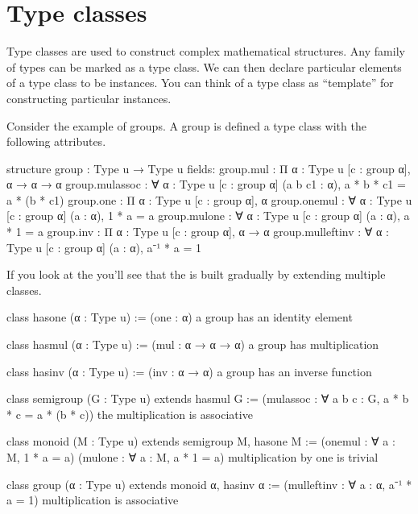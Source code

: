 \documentclass[letterpaper,10pt,english]{sphinxmanual}
\begin{document}
\section{Type classes}
\label{\detokenize{day5:type-classes}}
\sphinxAtStartPar
Type classes are used to construct complex mathematical structures.
Any family of types can be marked as a type class.
We can then declare particular elements of a type class to be instances.
You can think of a type class as “template” for constructing particular instances.

\sphinxAtStartPar
Consider the example of groups.
A group is defined a type class with the following attributes.

\begin{sphinxVerbatim}[commandchars=\\\{\}]
structure group : Type u → Type u
fields:
group.mul : Π \PYGZob{}α : Type u\PYGZcb{} [c : group α], α → α → α
group.mul\PYGZus{}assoc : ∀ \PYGZob{}α : Type u\PYGZcb{} [c : group α] (a b c\PYGZus{}1 : α), a * b * c\PYGZus{}1 = a * (b * c\PYGZus{}1)
group.one : Π \PYGZob{}α : Type u\PYGZcb{} [c : group α], α
group.one\PYGZus{}mul : ∀ \PYGZob{}α : Type u\PYGZcb{} [c : group α] (a : α), 1 * a = a
group.mul\PYGZus{}one : ∀ \PYGZob{}α : Type u\PYGZcb{} [c : group α] (a : α), a * 1 = a
group.inv : Π \PYGZob{}α : Type u\PYGZcb{} [c : group α], α → α
group.mul\PYGZus{}left\PYGZus{}inv : ∀ \PYGZob{}α : Type u\PYGZcb{} [c : group α] (a : α), a⁻¹ * a = 1
\end{sphinxVerbatim}

\sphinxAtStartPar
If you look at the  you’ll see that the  is built gradually by extending multiple classes.

\begin{sphinxVerbatim}[commandchars=\\\{\}]
class has\PYGZus{}one      (α : Type u) := (one : α)
\PYGZhy{}\PYGZhy{} a group has an identity element

class has\PYGZus{}mul      (α : Type u) := (mul : α → α → α)
\PYGZhy{}\PYGZhy{} a group has multiplication

class has\PYGZus{}inv      (α : Type u) := (inv : α → α)
\PYGZhy{}\PYGZhy{} a group has an inverse function

class semigroup (G : Type u) extends has\PYGZus{}mul G :=
(mul\PYGZus{}assoc : ∀ a b c : G, a * b * c = a * (b * c))
\PYGZhy{}\PYGZhy{} the multiplication is associative

class monoid (M : Type u) extends semigroup M, has\PYGZus{}one M :=
(one\PYGZus{}mul : ∀ a : M, 1 * a = a) (mul\PYGZus{}one : ∀ a : M, a * 1 = a)
\PYGZhy{}\PYGZhy{} multiplication by one is trivial

class group (α : Type u) extends monoid α, has\PYGZus{}inv α :=
(mul\PYGZus{}left\PYGZus{}inv : ∀ a : α, a⁻¹ * a = 1)
\PYGZhy{}\PYGZhy{} multiplication is associative
\end{sphinxVerbatim}
\end{document}
